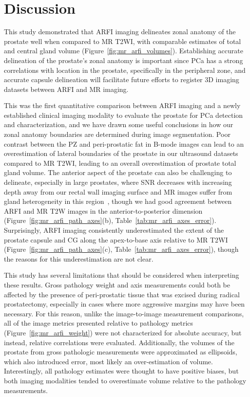 \section{Discussion}\label{sect:discussion}
This study demonstrated that ARFI imaging delineates zonal anatomy of the
prostate well when compared to MR T2WI, with comparable estimates of total and
central gland volume (Figure~\ref{fig:mr_arfi_volumes}).  Establishing accurate
delineation of the prostate's zonal anatomy is important since PCa has a strong
correlations with location in the prostate, specifically in the peripheral
zone, and accurate capsule delineation will facilitate future efforts to
register 3D imaging datasets between ARFI and MR imaging.  

This was the first quantitative comparison between ARFI imaging and a newly
established clinical imaging modality to evaluate the prostate for PCa
detection and characterization, and we have drawn some useful conclusions in
how our zonal anatomy boundaries are determined during image segmentation.
Poor contrast between the PZ and peri-prostatic fat in B-mode images can lead
to an overestimation of lateral boundaries of the prostate in our ultrasound
datasets compared to MR T2WI, leading to an overall overestimation of prostate
total gland volume.  The anterior aspect of the prostate can also be
challenging to delineate, especially in large prostates, where SNR decreases
with increasing depth away from our rectal wall imaging surface and MR images
suffer from gland heterogeneity in this region~\cite{Gupta2013}, though we had
good agreement between ARFI and MR T2W images in the anterior-to-posterior
dimension (Figure~\ref{fig:mr_arfi_path_axes}(b),
Table~\ref{tab:mr_arfi_axes_error}).  Surprisingly, ARFI imaging consistently
underestimated the extent of the prostate capsule and CG along the apex-to-base
axis relative to MR T2WI (Figure~\ref{fig:mr_arfi_path_axes}(c),
Table~\ref{tab:mr_arfi_axes_error}), though the reasons for this
underestimation are not clear.

This study has several limitations that should be considered when interpreting
these results.  Gross pathology weight and axis measurements could both be
affected by the presence of peri-prostatic tissue that was excised during
radical prostatectomy, especially in cases where more aggressive margins may
have been necessary.  For this reason, unlike the image-to-image measurement
comparisons, all of the image metrics presented relative to pathology metrics
(Figure~\ref{fig:mr_arfi_weight}) were not characterized for absolute accuracy,
but instead, relative correlations were evaluated.  Additionally, the volumes
of the prostate from gross pathologic measurements were approximated as
ellipsoids, which also introduced error, most likely an over-estimation of
volume.  Interestingly, all pathology estimates were thought to have positive
biases, but both imaging modalities tended to overestimate volume relative to the
pathology measurements.

